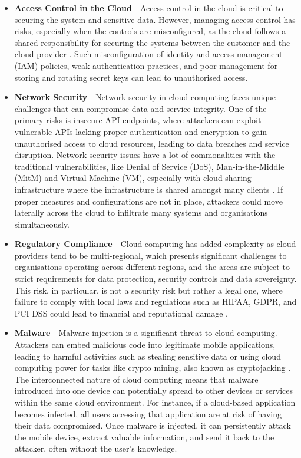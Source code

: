 \begin{itemize}
    \item \textbf{Access Control in the Cloud} - Access control in the cloud is critical to securing the system and sensitive data. However, managing access control has risks, especially when the controls are misconfigured, as the cloud follows a shared responsibility for securing the systems between the customer and the cloud provider \citep{cloud_shared_resp}. Such misconfiguration of identity and access management (IAM) policies, weak authentication practices, and poor management for storing and rotating secret keys can lead to unauthorised access.  

    \item \textbf{Network Security } - Network security in cloud computing faces unique challenges that can compromise data and service integrity. One of the primary risks is insecure API endpoints, where attackers can exploit vulnerable APIs lacking proper authentication and encryption to gain unauthorised access to cloud resources, leading to data breaches and service disruption. Network security issues have a lot of commonalities with the traditional vulnerabilities, like Denial of Service (DoS), Man-in-the-Middle (MitM) and Virtual Machine (VM), especially with cloud sharing infrastructure where the infrastructure is shared amongst many clients \citep{network_cloud}. If proper measures and configurations are not in place, attackers could move laterally across the cloud to infiltrate many systems and organisations simultaneously. 
    
    \item \textbf{Regulatory Compliance } - Cloud computing has added complexity as cloud providers tend to be multi-regional, which presents significant challenges to organisations operating across different regions, and the areas are subject to strict requirements for data protection, security controls and data sovereignty. This risk, in particular, is not a security risk but rather a legal one, where failure to comply with local laws and regulations such as HIPAA, GDPR, and PCI DSS could lead to financial and reputational damage \citep{legal_cloud_challenge}.
    
    \item \textbf{Malware} - Malware injection is a significant threat to cloud computing. Attackers can embed malicious code into legitimate mobile applications, leading to harmful activities such as stealing sensitive data or using cloud computing power for tasks like crypto mining, also known as cryptojacking \citep{cryptojacking}. The interconnected nature of cloud computing means that malware introduced into one device can potentially spread to other devices or services within the same cloud environment. For instance, if a cloud-based application becomes infected, all users accessing that application are at risk of having their data compromised. Once malware is injected, it can persistently attack the mobile device, extract valuable information, and send it back to the attacker, often without the user's knowledge.
    

\end{itemize}

